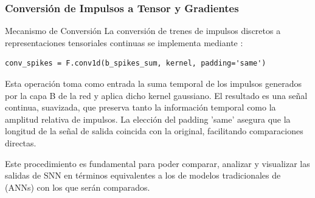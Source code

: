 




\subsubsection {Conversión de Impulsos a Tensor y Gradientes}
Mecanismo de Conversión
La conversión de trenes de impulsos discretos a representaciones tensoriales continuas se implementa mediante :

\begin{verbatim}
conv_spikes = F.conv1d(b_spikes_sum, kernel, padding='same')
\end{verbatim}

Esta operación toma como entrada la suma temporal de los impulsos generados por la capa B de la red y aplica dicho kernel gaussiano. El resultado es una señal continua, suavizada, que preserva tanto la información temporal como la amplitud relativa de impulsos. La elección del padding 'same' asegura que la longitud de la señal de salida coincida con la original, facilitando comparaciones directas.

Este procedimiento es fundamental para poder comparar, analizar y visualizar las salidas de SNN en términos equivalentes a los de modelos tradicionales de (ANNs) con los que serán comparados.

